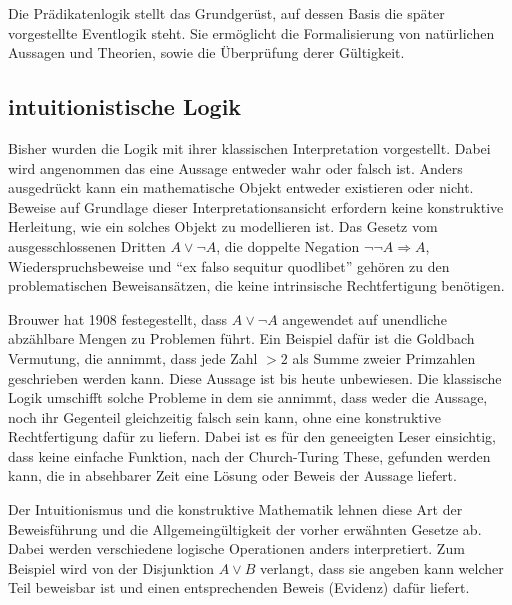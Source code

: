 Die Prädikatenlogik stellt das Grundgerüst, auf dessen Basis die später
vorgestellte Eventlogik steht. Sie ermöglicht die Formalisierung von natürlichen
Aussagen und Theorien, sowie die Überprüfung derer Gültigkeit.


\subsection{intuitionistische Logik}
Bisher wurden die Logik mit ihrer klassischen Interpretation vorgestellt.
Dabei wird angenommen das eine Aussage entweder wahr oder falsch ist.
Anders ausgedrückt kann ein mathematische Objekt entweder existieren oder
nicht. Beweise auf Grundlage dieser Interpretationsansicht erfordern keine
konstruktive Herleitung, wie ein solches Objekt zu modellieren ist.
Das Gesetz vom ausgesschlossenen Dritten $A\vee\neg A$, die doppelte Negation $\neg\neg A\Rightarrow
A$, Wiederspruchsbeweise und "`ex falso sequitur quodlibet"' gehören zu den
problematischen Beweisansätzen, die keine intrinsische Rechtfertigung
benötigen.~\cite{sep-logic-intuitionistic}

Brouwer hat 1908 festegestellt, dass $A\vee\neg A$ angewendet auf unendliche
abzählbare Mengen zu Problemen führt. Ein Beispiel dafür ist die Goldbach
Vermutung, die annimmt, dass jede Zahl $> 2$ als Summe zweier Primzahlen
geschrieben werden kann. Diese Aussage ist bis heute unbewiesen. Die klassische
Logik umschifft solche Probleme in dem sie annimmt, dass weder die Aussage, noch 
ihr Gegenteil gleichzeitig falsch sein kann, ohne eine konstruktive
Rechtfertigung dafür zu liefern. Dabei ist es für den geneeigten Leser
einsichtig, dass keine einfache Funktion, nach der Church-Turing These, 
gefunden werden kann, die in absehbarer Zeit eine Lösung oder Beweis der
Aussage liefert.~\cite{sep-logic-intuitionistic, sep-mathematics-constructive}

Der Intuitionismus und die konstruktive Mathematik lehnen diese Art der
Beweisführung und die Allgemeingültigkeit der vorher erwähnten Gesetze ab.
Dabei werden verschiedene logische Operationen anders interpretiert.
Zum Beispiel wird von der Disjunktion $A\vee B$ verlangt, dass sie angeben kann
welcher Teil beweisbar ist und einen entsprechenden Beweis (Evidenz)
dafür liefert.~\cite{kreitz1994automatisierte}


